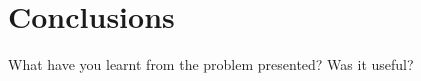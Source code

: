 \documentclass[a4paper, 11pt]{article}
\begin{document}


\section{Conclusions}



What have you learnt from the problem presented?
Was it useful?
\end{document}
